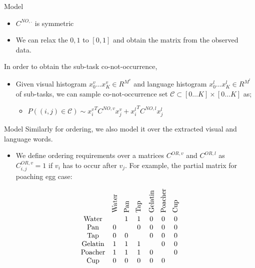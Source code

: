 \begin{frame}{Model}
\begin{itemize}
\item $C^{NO,.}$ is symmetric
\item We can relax the ${0,1}$ to $[0,1]$ and obtain the matrix from the observed data.
\end{itemize}
In order to obtain the sub-task co-not-occurrence,
\begin{itemize}
\item Given visual histogram $x^v_0 \ldots x^v_K \in R^{M^v}$ and language histogram $x^l_0 \ldots x^l_K \in R^{M^l}$ of sub-tasks, we can sample co-not-occurrence set $\mathcal{C} \subset [0\ldots K]
 \times [0 \ldots K]$ as;
\begin{itemize}
\item $P((i,j) \in \mathcal{C}) \sim {x^v_i}^T C^{NO,v} x^v_j + {x^l_i}^T C^{NO,l} x^l_j$
\end{itemize}
\end{itemize}
\end{frame}


\begin{frame}{Model}
Similarly for ordering, we also model it over the extracted visual and language words.
\begin{itemize}
\item We define ordering requirements over a matrices $C^{OR,v}$ and $C^{OR,l}$ as $C^{OR,v}_{i,j} =1$ if $v_i$ has to occur after $v_j$. For example, the partial matrix for poaching egg case:
\end{itemize}
\[
 \begin{array}{ccccccc}
&\rotatebox{90}{Water} & \rotatebox{90}{Pan} & \rotatebox{90}{Tap} & \rotatebox{90}{Gelatin} & \rotatebox{90}{Poacher} & \rotatebox{90}{Cup} \\
\text{Water} &  & 1 & 1 & 0 & 0 & 0 \\
\text{Pan} & 0 &  & 0 & 0 & 0 & 0 \\
\text{Tap} & 0 & 0 &  & 0 & 0 & 0 \\
\text{Gelatin} & 1 & 1 & 1 &  & 0 & 0 \\
\text{Poacher} & 1 & 1 & 1 & 0 &  & 0 \\
\text{Cup} & 0 & 0 & 0 & 0 & 0 &
\end{array}
\]
\end{frame}

